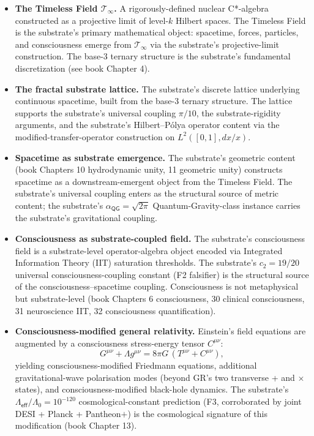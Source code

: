 \documentclass[11pt,a4paper]{amsart}
\theoremstyle{plain}
\theoremstyle{definition}
\begin{document}
\begin{itemize}[itemsep=4pt,leftmargin=2em]
\item \textbf{The Timeless Field $\mathcal{T}_\infty$.} A rigorously-defined nuclear C*-algebra constructed as a projective limit of level-$k$ Hilbert spaces. The Timeless Field is the substrate's primary mathematical object: spacetime, forces, particles, and consciousness emerge from $\mathcal{T}_\infty$ via the substrate's projective-limit construction. The base-3 ternary structure is the substrate's fundamental discretization (see book Chapter 4).
\item \textbf{The fractal substrate lattice.} The substrate's discrete lattice underlying continuous spacetime, built from the base-3 ternary structure. The lattice supports the substrate's universal coupling $\pi/10$, the substrate-rigidity arguments, and the substrate's Hilbert--P\'olya operator content via the modified-transfer-operator construction on $L^2([0,1], dx/x)$.
\item \textbf{Spacetime as substrate emergence.} The substrate's geometric content (book Chapters 10 hydrodynamic unity, 11 geometric unity) constructs spacetime as a downstream-emergent object from the Timeless Field. The substrate's universal coupling enters as the structural source of metric content; the substrate's $\alpha_{\textsf{QG}} = \sqrt{2\pi}$ Quantum-Gravity-class instance carries the substrate's gravitational coupling.
\item \textbf{Consciousness as substrate-coupled field.} The substrate's consciousness field is a substrate-level operator-algebra object encoded via Integrated Information Theory (IIT) saturation thresholds. The substrate's $c_2 = 19/20$ universal consciousness-coupling constant (F2 falsifier) is the structural source of the consciousness--spacetime coupling. Consciousness is not metaphysical but substrate-level (book Chapters 6 consciousness, 30 clinical consciousness, 31 neuroscience IIT, 32 consciousness quantification).
\item \textbf{Consciousness-modified general relativity.} Einstein's field equations are augmented by a consciousness stress-energy tensor $C^{\mu\nu}$:
\[
G^{\mu\nu} + \Lambda g^{\mu\nu} = 8\pi G\,(T^{\mu\nu} + C^{\mu\nu}),
\]
yielding consciousness-modified Friedmann equations, additional gravitational-wave polarisation modes (beyond GR's two transverse + and $\times$ states), and consciousness-modified black-hole dynamics. The substrate's $\Lambda_{\textsf{eff}}/\Lambda_0 = 10^{-120}$ cosmological-constant prediction (F3, corroborated by joint DESI + Planck + Pantheon$+$) is the cosmological signature of this modification (book Chapter 13).

\end{itemize}
\end{document}
